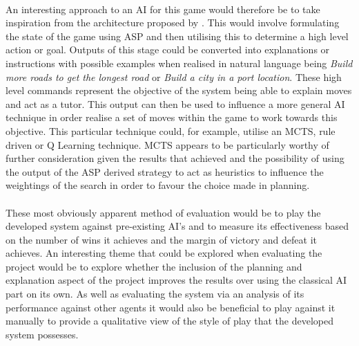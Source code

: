 \documentclass[]{article}
\begin{document}
\paragraph{}
An interesting approach to an AI for this game would therefore be to take inspiration from the architecture proposed by \textcite{colaco2015happened}. This would involve formulating the state of the game using ASP and then utilising this to determine a high level action or goal. Outputs of this stage could be converted into explanations or instructions with possible examples when realised in natural language being \textit{Build more roads to get the longest road} or \textit{Build a city in a port location}. These high level commands represent the objective of the system being able to explain moves and act as a tutor. This output can then be used to influence a more general AI technique in order realise a set of moves within the game to work towards this objective. This particular technique could, for example, utilise an MCTS, rule driven or Q Learning technique. MCTS appears to be particularly worthy of further consideration given the results that \textcite{szita2009monte} achieved and the possibility of using the output of the ASP derived strategy to act as heuristics to influence the weightings of the search in order to favour the choice made in planning. 

\paragraph{}
These most obviously apparent method of evaluation would be to play the developed system against pre-existing AI's and to measure its effectiveness based on the number of wins it achieves and the margin of victory and defeat it achieves. An interesting theme that could be explored when evaluating the project would be to explore whether the inclusion of the planning and explanation aspect of the project improves the results over using the classical AI part on its own. As well as evaluating the system via an analysis of its performance against other agents it would also be beneficial to play against it manually to provide a qualitative view of the style of play that the developed system possesses. 
\end{document}
